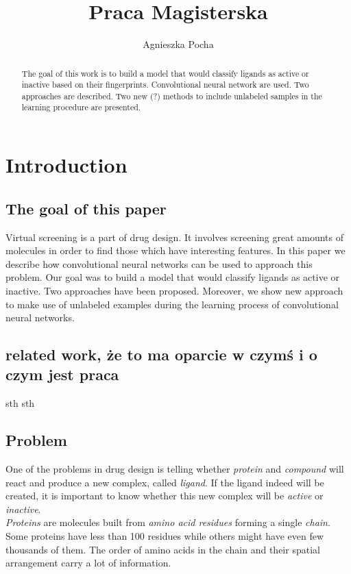 \documentclass[a4paper,10pt]{report}
\title{Praca Magisterska}
\author{Agnieszka Pocha}
\begin{document}
  \maketitle
  \begin{abstract}
    The goal of this work is to build a model that would classify ligands as active or inactive based on their fingerprints. Convolutional neural network are used. Two approaches are described. Two new (?) methods to include unlabeled samples in the learning procedure are presented.
  \end{abstract}
  \tableofcontents
    
  \chapter{Introduction}
    \section{The goal of this paper}
    
     Virtual screening is a part of drug design. It involves screening great amounts of molecules in order to find those which have interesting features. In this paper we describe how convolutional neural networks can be used to approach this problem. Our goal was to build a model that would classify ligands as active or inactive. Two approaches have been proposed. Moreover, we show new approach to make use of unlabeled examples during the learning process of convolutional neural networks.
    
    \section{related work, że to ma oparcie w czymś i o czym jest praca}
    sth sth %

    \section{Problem}
    One of the problems in drug design is telling whether \emph{protein} and \emph{compound} will react and produce a new complex, called \emph{ligand}. If the ligand indeed will be created, it is important to know whether this new complex will be \emph{active} or \emph{inactive}.\\
    
    \emph{Proteins} are molecules built from \emph{amino acid residues} forming a single \emph{chain}. Some proteins have less than 100 residues while others might have even few thousands of them. The order of amino acids in the chain and their spatial arrangement carry a lot of information.\\
    
\end{document}
